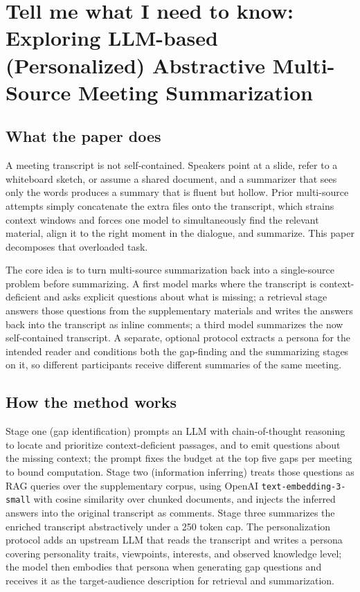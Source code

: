 \section{Tell me what I need to know: Exploring LLM-based (Personalized) Abstractive Multi-Source Meeting Summarization}

\subsection{What the paper does}

A meeting transcript is not self-contained. Speakers point at a slide, refer to a whiteboard sketch, or assume a shared document, and a summarizer that sees only the words produces a summary that is fluent but hollow. Prior multi-source attempts simply concatenate the extra files onto the transcript, which strains context windows and forces one model to simultaneously find the relevant material, align it to the right moment in the dialogue, and summarize. This paper decomposes that overloaded task.

The core idea is to turn multi-source summarization back into a single-source problem before summarizing. A first model marks where the transcript is context-deficient and asks explicit questions about what is missing; a retrieval stage answers those questions from the supplementary materials and writes the answers back into the transcript as inline comments; a third model summarizes the now self-contained transcript. A separate, optional protocol extracts a persona for the intended reader and conditions both the gap-finding and the summarizing stages on it, so different participants receive different summaries of the same meeting.

\subsection{How the method works}

Stage one (gap identification) prompts an LLM with chain-of-thought reasoning to locate and prioritize context-deficient passages, and to emit questions about the missing context; the prompt fixes the budget at the top five gaps per meeting to bound computation. Stage two (information inferring) treats those questions as RAG queries over the supplementary corpus, using OpenAI \texttt{text-embedding-3-small} with cosine similarity over chunked documents, and injects the inferred answers into the original transcript as comments. Stage three summarizes the enriched transcript abstractively under a 250 token cap. The personalization protocol adds an upstream LLM that reads the transcript and writes a persona covering personality traits, viewpoints, interests, and observed knowledge level; the model then embodies that persona when generating gap questions and receives it as the target-audience description for retrieval and summarization.

